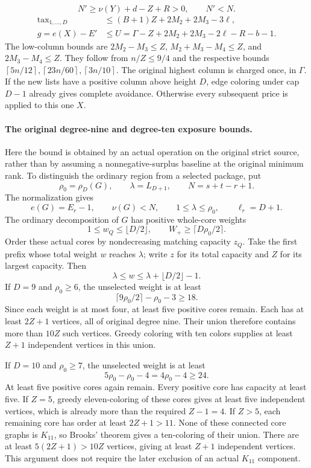 \documentclass[11pt,a4paper]{article}
\newcommand{\ceil}[1]{\left\lceil#1\right\rceil}
\theoremstyle{definition}
\begin{document}
\[
N'\ge\nu(Y)+d-Z+R>0,\qquad N'<N.
\]
\begin{equation}\label{eq:gap2-fixed}
\begin{split}
\mathrm{tax}_{1,\ldots,D}&\le(B+1)Z+2M_2+2M_3-3\ell,\\
g=e(X)-E'&\le U=\Gamma-Z+2M_2+2M_3-2\ell-R-b-1.
\end{split}
\end{equation}
The low-column bounds are
$2M_2-M_3\le Z$, $M_2+M_3-M_4\le Z$, and $2M_3-M_4\le Z$.
They follow from $n/Z\le9/4$ and the respective bounds
$\ceil{5n/12},\ceil{23n/60},\ceil{3n/10}$.
The original highest column is charged once, in $\Gamma$.
If the new lists have a positive column above height $D$,
edge coloring under cap $D-1$ already gives complete avoidance.
Otherwise every subsequent price is applied to this one $X$.

\paragraph{The original degree-nine and degree-ten exposure bounds.}
Here the bound is obtained by an actual operation on the original strict
source, rather than by assuming a nonnegative-surplus baseline at the
original minimum rank.  To distinguish the ordinary region from a selected
package, put
\[
 \rho_0=\rho_D(G),\qquad \lambda=L_{D+1},\qquad
 N=s+t-r+1.
\]
The normalization gives
\[
 e(G)=E_r-1,\qquad \nu(G)<N,\qquad
 1\le\lambda\le\rho_0,\qquad \ell_r=D+1.
\]
The ordinary decomposition of \(G\) has positive whole-core weights
\[
 1\le w_Q\le\lfloor D/2\rfloor,\qquad
 W_+\ge\lceil D\rho_0/2\rceil .
\]
Order these actual cores by nondecreasing matching capacity \(z_Q\).
Take the first prefix whose total weight \(w\) reaches \(\lambda\);
write \(z\) for its total capacity and \(Z\) for its largest capacity.
Then
\[
 \lambda\le w\le\lambda+\lfloor D/2\rfloor-1.
\]
If \(D=9\) and \(\rho_0\ge6\), the unselected weight is at least
\[
 \lceil9\rho_0/2\rceil-\rho_0-3\ge18.
\]
Since each weight is at most four, at least five positive cores remain.
Each has at least \(2Z+1\) vertices, all of original degree nine.
Their union therefore contains more than \(10Z\) such vertices.
Greedy coloring with ten colors supplies at least \(Z+1\) independent
vertices in this union.

If \(D=10\) and \(\rho_0\ge7\), the unselected weight is at least
\[
 5\rho_0-\rho_0-4=4\rho_0-4\ge24.
\]
At least five positive cores again remain.  Every positive core has
capacity at least five.  If \(Z=5\), greedy eleven-coloring of these
cores gives at least five independent vertices, which is already more
than the required \(Z-1=4\).  If \(Z>5\), each remaining core has order
at least \(2Z+1>11\).  None of these connected core graphs is
\(K_{11}\), so Brooks' theorem gives a ten-coloring of their union.
There are at least \(5(2Z+1)>10Z\) vertices, giving at least \(Z+1\)
independent vertices.  This argument does not require the later
exclusion of an actual \(K_{11}\) component.
\end{document}
